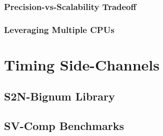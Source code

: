 \subsubsection{Precision-vs-Scalability Tradeoff}

\subsubsection{Leveraging Multiple CPUs}

\section{Timing Side-Channels}

\subsection{S2N-Bignum Library}

\subsection{SV-Comp Benchmarks}
